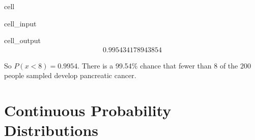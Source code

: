 \documentclass[letterpaper,10pt,english]{jupyterBook}
\begin{document}
\begin{sphinxuseclass}{cell}\begin{sphinxVerbatimInput}

\begin{sphinxuseclass}{cell_input}
\begin{sphinxVerbatim}[commandchars=\\\{\}]
\end{sphinxVerbatim}

\end{sphinxuseclass}\end{sphinxVerbatimInput}
\begin{sphinxVerbatimOutput}

\begin{sphinxuseclass}{cell_output}\begin{equation*}
\begin{split}0.995434178943854\end{split}
\end{equation*}
\end{sphinxuseclass}\end{sphinxVerbatimOutput}

\end{sphinxuseclass}
\sphinxAtStartPar
So \(P(x < 8) = 0.9954\). There is a 99.54\% chance that fewer than \(8\) of the \(200\) people sampled develop pancreatic cancer.

\sphinxstepscope


\section{Continuous Probability Distributions}
\label{\detokenize{Ch3 Probability/3.7 Continuous Probability Distributions:continuous-probability-distributions}}\label{\detokenize{Ch3 Probability/3.7 Continuous Probability Distributions::doc}}
\end{document}
